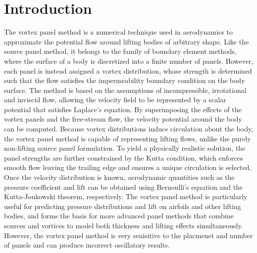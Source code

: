 \section{Introduction}
\label{sec:introduction}

The vortex panel method is a numerical technique used in aerodynamics to approximate the potential flow around lifting
bodies of arbitrary shape.
Like the source panel method, it belongs to the family of boundary element methods, where the surface of a body is
discretized into a finite number of panels.
However, each panel is instead assigned a vortex distribution, whose strength is determined such that the flow satisfies
the impermeability boundary condition on the body surface.
The method is based on the assumptions of incompressible, irrotational and inviscid flow, allowing the velocity field to
be represented by a scalar potential that satisfies Laplace's equation.
By superimposing the effects of the vortex panels and the free-stream flow, the velocity potential around the body can
be computed.
Because vortex distributions induce circulation about the body, the vortex panel method is capable of representing
lifting flows, unlike the purely non-lifting source panel formulation.
To yield a physically realistic solution, the panel strengths are further constrained by the Kutta condition, which
enforces smooth flow leaving the trailing edge and ensures a unique circulation is selected.
Once the velocity distribution is known, aerodynamic quantities such as the pressure coefficient and lift can be
obtained using Bernoulli's equation and the Kutta-Joukowski theorem, respectively.
The vortex panel method is particularly useful for predicting pressure distributions and lift on airfoils and other
lifting bodies, and forms the basis for more advanced panel methods that combine sources and vortices to model both
thickness and lifting effects simultaneously.
However, the vortex panel method is very senisitive to the placmenet and
number of panels and can produce incorrect oscillatory results.
